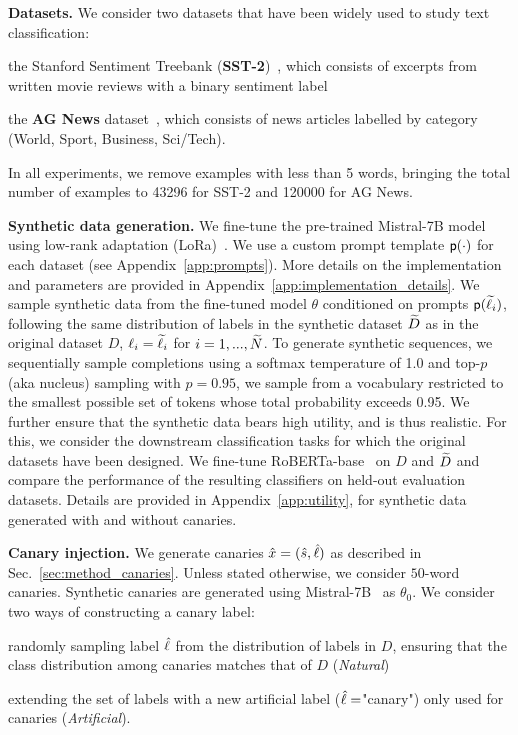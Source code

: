 \textbf{Datasets.} 
We consider two datasets that have been widely used to study text classification: 
%
\begin{inlineenum}
\item the Stanford Sentiment Treebank (\textbf{SST-2})~\citep{socher-etal-2013-recursive}, which consists of excerpts from written movie reviews with a binary sentiment label
\item the \textbf{AG News} dataset~\citep{Zhang2015CharacterlevelCN}, which consists of news articles labelled by category (World, Sport, Business, Sci/Tech).
\end{inlineenum}
%
In all experiments, we remove examples with less than \num{5} words, bringing the total number of examples to \num{43296} for SST-2 and \num{120000} for AG News.

\textbf{Synthetic data generation.} 
We fine-tune the pre-trained Mistral-7B model~\citep{jiang2023mistral} using low-rank adaptation (LoRa)~\citep{hulora}. We use a custom prompt template ${\textsf{p}(\cdot)}$ for each dataset (see Appendix~\ref{app:prompts}). More details on the implementation and parameters are provided in Appendix~\ref{app:implementation_details}. We sample synthetic data from the fine-tuned model $\theta$ conditioned on prompts ${\textsf{p}({\widetilde{\ell}}_i)}$, following the same distribution of labels in the synthetic dataset ${\widetilde{D}}$ as in the original dataset $D$, \ie $\ell_i = {\widetilde{\ell}}_i$ for $i=1,...,{\widetilde{N}}$. To generate synthetic sequences, we sequentially sample completions using a softmax temperature of \num{1.0} and top-$p$ (aka nucleus) sampling with $p = 0.95$, \ie we sample from a vocabulary restricted to the smallest possible set of tokens whose total probability exceeds \num{0.95}. We further ensure that the synthetic data bears high utility, and is thus realistic. For this, we consider the downstream classification tasks for which the original datasets have been designed. We fine-tune RoBERTa-base~\citep{DBLP:journals/corr/abs-1907-11692} on  $D$ and ${\widetilde{D}}$ and compare the performance of the resulting classifiers on held-out evaluation datasets. Details are provided in Appendix~\ref{app:utility}, for synthetic data generated with and without canaries.

\textbf{Canary injection.} 
We generate canaries ${\hat{x}} = ({\hat{s}}, {\hat{\ell}})$ as described in Sec.~\ref{sec:method_canaries}. Unless stated otherwise, we consider $50$-word canaries. Synthetic canaries are generated using Mistral-7B~\citep{jiang2023mistral} as $\theta_0$. We consider two ways of constructing a canary label:
%
\begin{inlineenum}
\item randomly sampling label ${\hat{\ell}}$ from the distribution of labels in $D$, ensuring that the class distribution among canaries matches that of $D$ (\emph{Natural}) 
\item extending the set of labels with a new artificial label (${\hat{\ell}}=$"canary") only used for canaries (\emph{Artificial}). 
\end{inlineenum}

